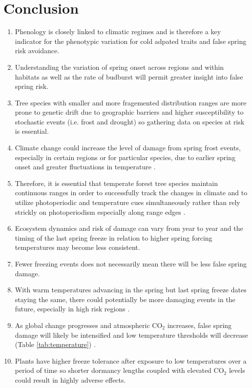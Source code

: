 \documentclass{article}\usepackage[]{graphicx}\usepackage[]{color}
\begin{document}
\section*{Conclusion}
\begin{enumerate}
\item Phenology is closely linked to climatic regimes \citep{Wolkovich2011} and is therefore a key indicator for the phenotypic variation for cold adpated traits and false spring risk avoidance.
\item Understanding the variation of spring onset across regions and within habitats as well as the rate of budburst will permit greater insight into false spring risk.
\item Tree species with smaller and more fragemented distribution ranges are more prone to genetic drift due to geographic barriers and higher susceptibility to stochastic events (i.e. frost and drought) \citep{Alberto2013} so gathering data on species at risk is essential. 
\item Climate change could increase the level of damage from spring frost events, especially in certain regions or for particular species, due to earlier spring onset and greater fluctuations in temperature \citep{Martin2010}. 
\item Therefore, it is essential that temperate forest tree species maintain continuous ranges in order to successfully track the changes in climate and to utilize photoperiodic and temperature cues simultaneously rather than rely strickly on photoperiodism especially along range edges \citep{Zohner2016, Gauzere2017}.
\item Ecosystem dynamics and risk of damage can vary from year to year and the timing of the last spring freeze in relation to higher spring forcing temperatures may become less consistent. 
\item Fewer freezing events does not necessarily mean there will be less false spring damage.
\item With warm temperatures advancing in the spring but last spring freeze dates staying the same, there could potentially be more damaging events in the future, especially in high risk regions \citep{Gu2008, Inouye2008}.
\item As global change progresses and atmospheric CO$_{\text{2}}$ increases, false spring damage will likely be intensified and low temperature thresholds will decrease (Table \ref{tab:temperature}) \citep{Beerling2001, Barker2005}.
\item Plants have higher freeze tolerance after exposure to low temperatures over a period of time \citep{Thomashow1999} so shorter dormancy lengths coupled with elevated CO$_{\text{2}}$ levels could result in highly adverse effects. 

\end{enumerate}
\end{document}
